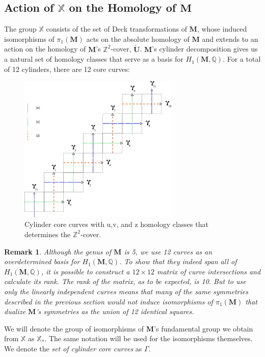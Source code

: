 \documentclass[]{article}
\newtheorem*{rem}{Remark}
\begin{document}
\subsection{Action of $\mathbb X$ on the Homology of $\mathbf M$}
The group $\mathbb X$ consists of the set of Deck transformations of $\mathbf{M}$, whose induced isomorphisms of $\pi_1(\mathbf{M})$ acts on the absolute homology of $\mathbf{M}$ and extends to an action on the homology of $\mathbf{M}$'s $\mathbb{Z}^2$-cover, $\tilde{\mathbf{U}}$. $\mathbf{M}$'s cylinder decomposition gives us a natural set of homology classes that serve as a basis for $H_1(\mathbf{M},\mathbb Q)$. For a total of 12 cylinders, there are 12 core curves:

\begin{figure}[H]
\includegraphics[width=3in]{homologyclass.png}
\centering
\caption{Cylinder core curves with u,v, and z homology classes that determines the $\mathbb{Z}^2$-cover.}
\end{figure}

\begin{rem}
Although the genus of $\mathbf{M}$ is 5, we use 12 curves as an overdetermined basis for $H_1(\mathbf{M},\mathbb Q)$. To show that they indeed span all of $H_1(\mathbf{M},\mathbb Q)$, it is possible to construct a $12\times12$ matrix of curve intersections and calculate its rank. The rank of the matrix, as to be expected, is 10. But to use only the linearly independent curves means that many of the same symmetries described in the previous section would not induce isomorphisms of $\pi_1(\mathbf{M})$ that dualize $\mathbf{M}$'s symmetries as the union of 12 identical squares.
\end{rem}

We will denote the group of isomorphisms of $\mathbf{M}$'s fundamental group we obtain from $\mathbb{X}$ as $\mathbb X_*$. The same notation will be used for the isomorphisms themselves. We denote the \emph{set of cylinder core curves} as $\Gamma$.
\end{document}
